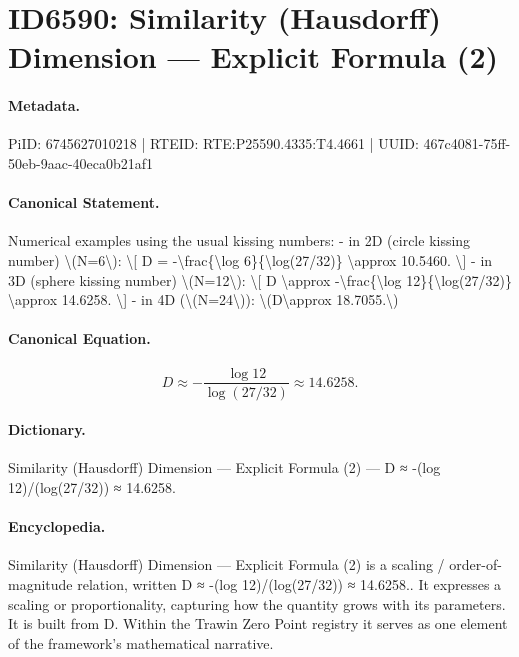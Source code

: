 \section*{ID6590: Similarity (Hausdorff) Dimension — Explicit Formula (2)}
\paragraph{Metadata.}
PiID: 6745627010218 | RTEID: RTE:P25590.4335:T4.4661 | UUID: 467c4081-75ff-50eb-9aac-40eca0b21af1

\paragraph{Canonical Statement.}
Numerical examples using the usual kissing numbers: - in 2D (circle kissing number) \textbackslash{}(N=6\textbackslash{}): \textbackslash{}[ D = -\textbackslash{}frac\{\textbackslash{}log 6\}\{\textbackslash{}log(27/32)\} \textbackslash{}approx 10.5460. \textbackslash{}] - in 3D (sphere kissing number) \textbackslash{}(N=12\textbackslash{}): \textbackslash{}[ D \textbackslash{}approx -\textbackslash{}frac\{\textbackslash{}log 12\}\{\textbackslash{}log(27/32)\} \textbackslash{}approx 14.6258. \textbackslash{}] - in 4D (\textbackslash{}(N=24\textbackslash{})): \textbackslash{}(D\textbackslash{}approx 18.7055.\textbackslash{})

\paragraph{Canonical Equation.}
\[
D \approx -\frac{\log 12}{\log(27/32)} \approx 14.6258.
\]

\paragraph{Dictionary.}
Similarity (Hausdorff) Dimension — Explicit Formula (2) — D ≈ -(log 12)/(log(27/32)) ≈ 14.6258.

\paragraph{Encyclopedia.}
Similarity (Hausdorff) Dimension — Explicit Formula (2) is a scaling / order-of-magnitude relation, written D ≈ -(log 12)/(log(27/32)) ≈ 14.6258.. It expresses a scaling or proportionality, capturing how the quantity grows with its parameters. It is built from D. Within the Trawin Zero Point registry it serves as one element of the framework's mathematical narrative.
